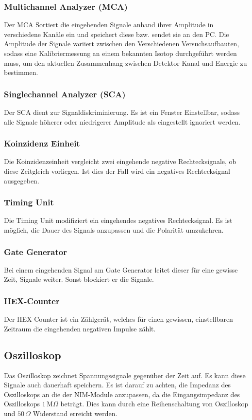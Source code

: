 \subsubsection{Multichannel Analyzer (MCA)}
Der MCA Sortiert die eingehenden Signale anhand ihrer Amplitude in verschiedene Kanäle ein und speichert diese bzw. sendet sie an den PC. Die Amplitude der Signale variiert zwischen den Verschiedenen Versuchsaufbauten, sodass eine Kalibriermessung an einem bekannten Isotop durchgeführt werden muss, um den aktuellen Zusammenhang zwischen Detektor Kanal und Energie zu bestimmen.
\subsubsection{Singlechannel Analyzer (SCA)}
Der SCA dient zur Signaldiskriminierung. Es ist ein Fenster Einstellbar, sodass alle Signale höherer oder niedrigerer Amplitude als eingestellt ignoriert werden. 
\subsubsection{Koinzidenz Einheit}
Die Koinzidenzeinheit vergleicht zwei eingehende negative Rechtecksignale, ob diese Zeitgleich vorliegen. Ist dies der Fall wird ein negatives Rechtecksignal ausgegeben.
\subsubsection{Timing Unit}
Die Timing Unit modifiziert ein eingehendes negatives Rechtecksignal. Es ist möglich, die Dauer des Signals anzupassen und die Polarität umzukehren.
\subsubsection{Gate Generator}
Bei einem eingehenden Signal am Gate Generator leitet dieser für eine gewisse Zeit, Signale weiter. Sonst blockiert er die Signale.
\subsubsection{HEX-Counter}
Der HEX-Counter ist ein Zählgerät, welches für einen gewissen, einstellbaren Zeitraum die eingehenden negativen Impulse zählt.


\subsection{Oszilloskop}
Das Oszilloskop zeichnet Spannungssignale gegenüber der Zeit auf. Es kann diese Signale auch dauerhaft speichern. Es ist darauf zu achten, die Impedanz des Oszilloskops an die der NIM-Module anzupassen, da die Eingangsimpedanz des Oszilloskops $1\,\textrm{M}\Omega$ beträgt. Dies kann durch eine Reihenschaltung von Oszilloskop und $50\,\Omega$ Widerstand erreicht werden.

